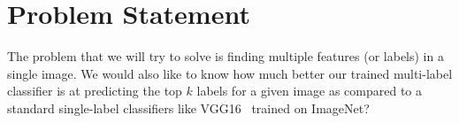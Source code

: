 \documentclass[10pt, a4paper, twocolumn]{article} %
\begin{document}
\section{Problem Statement} %


The problem that we will try to solve is finding multiple features (or labels) in a single image. We would also like to know how much better our trained multi-label classifier is at predicting the top $k$ labels for a given image as compared to a standard single-label classifiers like VGG16~\cite{SimonyanZ14a} trained on ImageNet?


\end{document}
